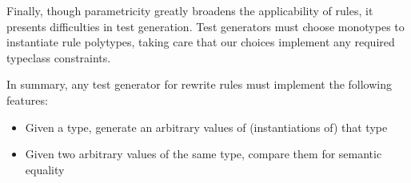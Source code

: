 Finally, though parametricity greatly broadens the applicability of rules, it presents difficulties in test generation. Test generators must choose monotypes to instantiate rule polytypes, taking care that our choices implement any required typeclass constraints.

In summary, any test generator for rewrite rules must implement the following features:

\begin{itemize}
  \item Given a type, generate an arbitrary values of (instantiations of) that type
  \item Given two arbitrary values of the same type, compare them for semantic equality
\end{itemize}
